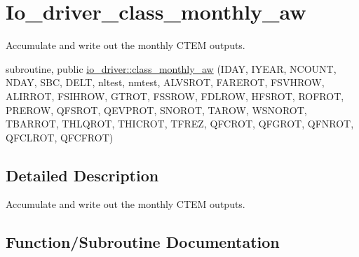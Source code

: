 \hypertarget{group__io__driver__class__monthly__aw}{}\section{Io\+\_\+driver\+\_\+class\+\_\+monthly\+\_\+aw}
\label{group__io__driver__class__monthly__aw}


Accumulate and write out the monthly C\+T\+E\+M outputs.  


\begin{DoxyCompactItemize}
\item 
subroutine, public \hyperlink{group__io__driver__class__monthly__aw_ga5036e6789d5928d201cfc65ce1997831}{io\+\_\+driver\+::class\+\_\+monthly\+\_\+aw} (I\+D\+A\+Y, I\+Y\+E\+A\+R, N\+C\+O\+U\+N\+T, N\+D\+A\+Y, S\+B\+C, D\+E\+L\+T, nltest, nmtest, A\+L\+V\+S\+R\+O\+T, F\+A\+R\+E\+R\+O\+T, F\+S\+V\+H\+R\+O\+W, A\+L\+I\+R\+R\+O\+T, F\+S\+I\+H\+R\+O\+W, G\+T\+R\+O\+T, F\+S\+S\+R\+O\+W, F\+D\+L\+R\+O\+W, H\+F\+S\+R\+O\+T, R\+O\+F\+R\+O\+T, P\+R\+E\+R\+O\+W, Q\+F\+S\+R\+O\+T, Q\+E\+V\+P\+R\+O\+T, S\+N\+O\+R\+O\+T, T\+A\+R\+O\+W, W\+S\+N\+O\+R\+O\+T, T\+B\+A\+R\+R\+O\+T, T\+H\+L\+Q\+R\+O\+T, T\+H\+I\+C\+R\+O\+T, T\+F\+R\+E\+Z, Q\+F\+C\+R\+O\+T, Q\+F\+G\+R\+O\+T, Q\+F\+N\+R\+O\+T, Q\+F\+C\+L\+R\+O\+T, Q\+F\+C\+F\+R\+O\+T)
\end{DoxyCompactItemize}


\subsection{Detailed Description}
Accumulate and write out the monthly C\+T\+E\+M outputs. 



\subsection{Function/\+Subroutine Documentation}
\hypertarget{group__io__driver__class__monthly__aw_ga5036e6789d5928d201cfc65ce1997831}{}
